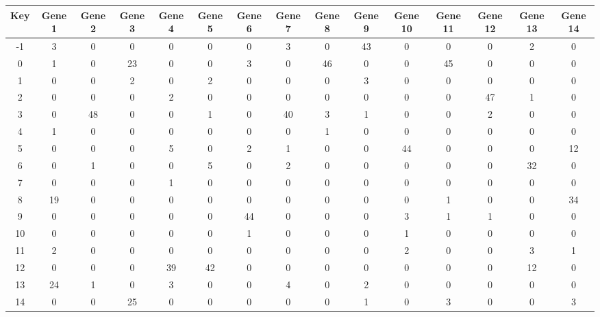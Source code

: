 \begin{tabular}{|c|c|c|c|c|c|c|c|c|c|c|c|c|c|c|}
\hline
Key & Gene 1 & Gene 2 & Gene 3 & Gene 4 & Gene 5 & Gene 6 & Gene 7 & Gene 8 & Gene 9 & Gene 10 & Gene 11 & Gene 12 & Gene 13 & Gene 14 \\
\hline
-1 & 3 & 0 & 0 & 0 & 0 & 0 & 3 & 0 & 43 & 0 & 0 & 0 & 2 & 0 \\
0 & 1 & 0 & 23 & 0 & 0 & 3 & 0 & 46 & 0 & 0 & 45 & 0 & 0 & 0 \\
1 & 0 & 0 & 2 & 0 & 2 & 0 & 0 & 0 & 3 & 0 & 0 & 0 & 0 & 0 \\
2 & 0 & 0 & 0 & 2 & 0 & 0 & 0 & 0 & 0 & 0 & 0 & 47 & 1 & 0 \\
3 & 0 & 48 & 0 & 0 & 1 & 0 & 40 & 3 & 1 & 0 & 0 & 2 & 0 & 0 \\
4 & 1 & 0 & 0 & 0 & 0 & 0 & 0 & 1 & 0 & 0 & 0 & 0 & 0 & 0 \\
5 & 0 & 0 & 0 & 5 & 0 & 2 & 1 & 0 & 0 & 44 & 0 & 0 & 0 & 12 \\
6 & 0 & 1 & 0 & 0 & 5 & 0 & 2 & 0 & 0 & 0 & 0 & 0 & 32 & 0 \\
7 & 0 & 0 & 0 & 1 & 0 & 0 & 0 & 0 & 0 & 0 & 0 & 0 & 0 & 0 \\
8 & 19 & 0 & 0 & 0 & 0 & 0 & 0 & 0 & 0 & 0 & 1 & 0 & 0 & 34 \\
9 & 0 & 0 & 0 & 0 & 0 & 44 & 0 & 0 & 0 & 3 & 1 & 1 & 0 & 0 \\
10 & 0 & 0 & 0 & 0 & 0 & 1 & 0 & 0 & 0 & 1 & 0 & 0 & 0 & 0 \\
11 & 2 & 0 & 0 & 0 & 0 & 0 & 0 & 0 & 0 & 2 & 0 & 0 & 3 & 1 \\
12 & 0 & 0 & 0 & 39 & 42 & 0 & 0 & 0 & 0 & 0 & 0 & 0 & 12 & 0 \\
13 & 24 & 1 & 0 & 3 & 0 & 0 & 4 & 0 & 2 & 0 & 0 & 0 & 0 & 0 \\
14 & 0 & 0 & 25 & 0 & 0 & 0 & 0 & 0 & 1 & 0 & 3 & 0 & 0 & 3 \\
\hline
\end{tabular}